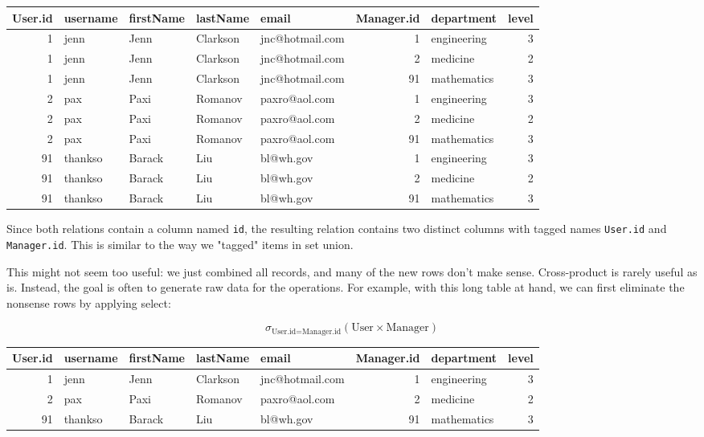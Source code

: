 \documentclass[12pt, a4paper, justified, notitlepage, sfsidenotes, notoc]{book}
\begin{document}
\begin{enumerate}
\begin{center}
\begin{tabular}{rllllrlr}
User.id & username & firstName & lastName & email & Manager.id & department & level\\
\hline
1 & jenn & Jenn & Clarkson & jnc@hotmail.com & 1 & engineering & 3\\
1 & jenn & Jenn & Clarkson & jnc@hotmail.com & 2 & medicine & 2\\
1 & jenn & Jenn & Clarkson & jnc@hotmail.com & 91 & mathematics & 3\\
2 & pax & Paxi & Romanov & paxro@aol.com & 1 & engineering & 3\\
2 & pax & Paxi & Romanov & paxro@aol.com & 2 & medicine & 2\\
2 & pax & Paxi & Romanov & paxro@aol.com & 91 & mathematics & 3\\
91 & thankso & Barack & Liu & bl@wh.gov & 1 & engineering & 3\\
91 & thankso & Barack & Liu & bl@wh.gov & 2 & medicine & 2\\
91 & thankso & Barack & Liu & bl@wh.gov & 91 & mathematics & 3\\
\end{tabular}
\end{center}

Since both relations contain a column named \texttt{id}, the resulting relation contains two distinct columns with tagged names \texttt{User.id} and \texttt{Manager.id}. This is similar to the way we "tagged" items in set union.

This might not seem too useful: we just combined all records, and many of the new rows don't make sense. Cross-product is rarely useful as is. Instead, the goal is often to generate raw data for the operations. For example, with this long table at hand, we can first eliminate the nonsense rows by applying select:

\begin{equation}
\sigma_{\textrm{User.id} = \textrm{Manager.id}} (\textrm{User} \times \textrm{Manager})
\end{equation}


\begin{center}
\begin{tabular}{rllllrlr}
User.id & username & firstName & lastName & email & Manager.id & department & level\\
\hline
1 & jenn & Jenn & Clarkson & jnc@hotmail.com & 1 & engineering & 3\\
2 & pax & Paxi & Romanov & paxro@aol.com & 2 & medicine & 2\\
91 & thankso & Barack & Liu & bl@wh.gov & 91 & mathematics & 3\\
\end{tabular}
\end{center}


\end{enumerate}
\end{document}
